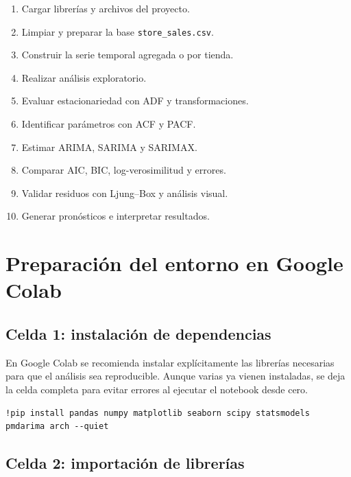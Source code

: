 \documentclass[11pt,letterpaper]{article}
\newcommand{\code}[1]{\texttt{#1}}
\begin{document}
\begin{enumerate}[label=\arabic*.]
    \item Cargar librerías y archivos del proyecto.
    \item Limpiar y preparar la base \code{store\_sales.csv}.
    \item Construir la serie temporal agregada o por tienda.
    \item Realizar análisis exploratorio.
    \item Evaluar estacionariedad con ADF y transformaciones.
    \item Identificar parámetros con ACF y PACF.
    \item Estimar ARIMA, SARIMA y SARIMAX.
    \item Comparar AIC, BIC, log-verosimilitud y errores.
    \item Validar residuos con Ljung--Box y análisis visual.
    \item Generar pronósticos e interpretar resultados.
\end{enumerate}

\section{Preparación del entorno en Google Colab}

\subsection{Celda 1: instalación de dependencias}

\begin{markdowncell}
En Google Colab se recomienda instalar explícitamente las librerías necesarias para que el análisis sea reproducible. Aunque varias ya vienen instaladas, se deja la celda completa para evitar errores al ejecutar el notebook desde cero.
\end{markdowncell}

\begin{lstlisting}[style=bashstyle]
!pip install pandas numpy matplotlib seaborn scipy statsmodels pmdarima arch --quiet
\end{lstlisting}

\subsection{Celda 2: importación de librerías}
\end{document}
